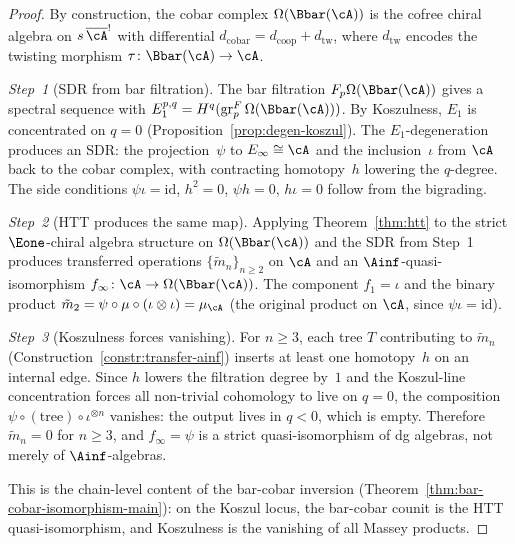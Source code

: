 \begin{proof}
By construction, the cobar complex $\Omega(\Bbar(\cA))$ is the
cofree chiral algebra on $s\,\overline{\cA}^!$ with differential
$d_{\mathrm{cobar}} = d_{\mathrm{coop}} + d_{\mathrm{tw}}$, where
$d_{\mathrm{tw}}$ encodes the twisting morphism
$\tau \colon \Bbar(\cA) \to \cA$.

\emph{Step~1} (SDR from bar filtration).
The bar filtration $F_p\Omega(\Bbar(\cA))$ gives a spectral sequence
with $E_1^{p,q} = H^q(\mathrm{gr}_p^F\,\Omega(\Bbar(\cA)))$.
By Koszulness, $E_1$ is concentrated on $q = 0$
(Proposition~\ref{prop:degen-koszul}). The $E_1$-degeneration
produces an SDR: the projection~$\psi$ to
$E_\infty \cong \cA$ and the inclusion~$\iota$ from $\cA$ back to the
cobar complex, with contracting homotopy~$h$ lowering the $q$-degree.
The side conditions $\psi\iota = \mathrm{id}$, $h^2 = 0$, $\psi h = 0$,
$h\iota = 0$ follow from the bigrading.

\emph{Step~2} (HTT produces the same map).
Applying Theorem~\ref{thm:htt} to the strict $\Eone$-chiral algebra
structure on $\Omega(\Bbar(\cA))$ and the SDR from Step~1 produces
transferred operations $\{\tilde{m}_n\}_{n \geq 2}$ on $\cA$
and an $\Ainf$-quasi-isomorphism $f_\infty \colon \cA \to
\Omega(\Bbar(\cA))$. The component $f_1 = \iota$ and the
binary product $\tilde{m}_2 = \psi \circ \mu \circ
(\iota \otimes \iota) = \mu_{\cA}$ (the original product on $\cA$,
since $\psi\iota = \mathrm{id}$).

\emph{Step~3} (Koszulness forces vanishing).
For $n \geq 3$, each tree $T$ contributing to $\tilde{m}_n$
(Construction~\ref{constr:transfer-ainf}) inserts at least one
homotopy~$h$ on an internal edge. Since $h$ lowers the filtration
degree by~$1$ and the Koszul-line concentration forces all
non-trivial cohomology to live on $q = 0$, the composition
$\psi \circ (\text{tree})\circ \iota^{\otimes n}$ vanishes: the
output lives in $q < 0$, which is empty. Therefore
$\tilde{m}_n = 0$ for $n \geq 3$, and $f_\infty = \psi$ is a
strict quasi-isomorphism of dg algebras, not merely of $\Ainf$-algebras.

This is the chain-level content of the bar-cobar inversion
(Theorem~\ref{thm:bar-cobar-isomorphism-main}): on the Koszul locus,
the bar-cobar counit is the HTT quasi-isomorphism, and Koszulness is
the vanishing of all Massey products.
\end{proof}


